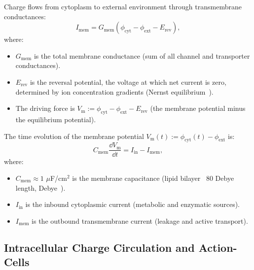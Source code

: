 \begin{definition}
\label{def:transmembrane-conductance}
Charge flows from cytoplasm to external environment through transmembrane conductances:
\begin{equation}
  I_{\text{mem}} = G_{\text{mem}}(\phi_{\text{cyt}} - \phi_{\text{ext}} - E_{\text{rev}}),
\end{equation}
where:
\begin{itemize}[noitemsep]
\item $G_{\text{mem}}$ is the total membrane conductance (sum of all channel and transporter conductances).
\item $E_{\text{rev}}$ is the reversal potential, the voltage at which net current is zero, determined by ion concentration gradients (Nernst equilibrium~\cite{NernstEquation1888}).
\item The driving force is $V_{\text{m}} := \phi_{\text{cyt}} - \phi_{\text{ext}} - E_{\text{rev}}$ (the membrane potential minus the equilibrium potential).
\end{itemize}
\end{definition}

\begin{proposition}
\label{prop:membrane-potential}
The time evolution of the membrane potential $V_{\text{m}}(t) := \phi_{\text{cyt}}(t) - \phi_{\text{ext}}$ is:
\begin{equation}
  C_{\text{mem}} \frac{\dd V_{\text{m}}}{\dd t} = I_{\text{in}} - I_{\text{mem}},
\end{equation}
where:
\begin{itemize}[noitemsep]
\item $C_{\text{mem}} \approx 1$ $\mu$F/cm$^2$ is the membrane capacitance (lipid bilayer ~80 Debye length, Debye~\cite{Debye1923,GouyChapman1910}).
\item $I_{\text{in}}$ is the inbound cytoplasmic current (metabolic and enzymatic sources).
\item $I_{\text{mem}}$ is the outbound transmembrane current (leakage and active transport).
\end{itemize}
\end{proposition}

\subsection{Intracellular Charge Circulation and Action-Cells}
\label{subsec:intracellular-circulation}

